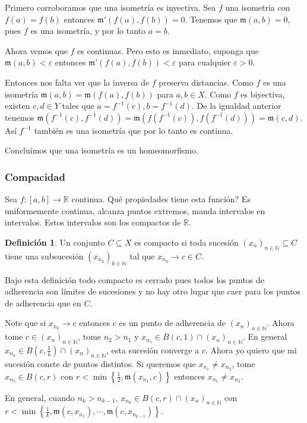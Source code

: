 \documentclass[12pt]{article}
\theoremstyle{plain}
\theoremstyle{definition}
\newtheorem{Def}[Th]{Definición}       %
\theoremstyle{remark}
\numberwithin{equation}{section}
\newcommand{\bN}{\mathbb{N}}        %
\newcommand{\bR}{\mathbb{R}}        %
\newcommand{\mm}{\mathfrak{m}}      %
\renewcommand{\:}{\colon}           %
\newcommand{\conj}[1]{\left\lbrace#1\right\rbrace}
\newcommand{\bonj}[1]{\left\lbrack#1\right\rbrack}
\begin{document}
\begin{multicols}{2}
\begin{ptcb}
Primero corroboramos que una isometría es inyectiva. Sea $f$ una isometría con $f(a)=f(b)$ entonces $\mm'(f(a),f(b))=0$. Tenemos que $\mm(a,b)=0$, pues $f$ es una isometría, y por lo tanto $a=b$.\par
Ahora vemos que $f$ es continuas. Pero esto es inmediato, suponga que $\mm(a,b)<\varepsilon$ entonces $\mm'(f(a),f(b))<\varepsilon$ para cualquier $\varepsilon>0$.\par
Entonces nos falta ver que la inversa de $f$ preserva distancias. Como $f$ es una isometría $\mm(a,b)=\mm(f(a),f(b))$ para $a,b\in X$. Como $f$ es biyectiva, existen $c,d\in Y$ tales que $a=f^{-1}(c), b=f^{-1}(d)$. De la igualdad anterior tenemos $\mm(f^{-1}(c),f^{-1}(d))=\mm(f(f^{-1}(c)),f(f^{-1}(d)))=\mm(c,d)$. Así $f^{-1}$ también es una isometría que por lo tanto es continua. \par
Concluímos que una isometría es un homeomorfismo.
\end{ptcb}

\subsubsection*{Compacidad}

Sea $f\colon\bonj{a,b}\to \bR$ continua. Qué propiedades tiene esta función? Es uniformemente continua, alcanza puntos extremos, manda intervalos en intervalos. Estos intervalos son los compactos de $\bR$.

\begin{Def}\label{def:compactoSuccs}
  Un conjunto $C\subseteq X$ es compacto si toda sucesión $(x_n)_{n\in\bN}\subseteq C$ tiene una subsucesión $(x_{n_k})_{k\in\bN}$ tal que $x_{n_k}\to c\in C$.
\end{Def}

Bajo esta definición todo compacto es cerrado pues todos los puntos de adherencia son límites de sucesiones y no hay otro lugar que caer para los puntos de adherencia que en $C$.

Note que si $x_{n_k}\to c$ entonces $c$ es un punto de adherencia de $(x_n)_{n\in\bN}$.
Ahora tome $c\in\overline{(x_n)_{n\in\bN}}$, tome $n_2> n_1$ y $x_{n_1}\in B(c,1)\cap(x_n)_{n\in\bN}$. En general $x_{n_k}\in B(c,\frac{1}{k})\cap(x_n)_{n\in\bN}$, esta sucesión converge a $c$. Ahora yo quiero que mi sucesión conste de puntos distintos. Si queremos que $x_{n_1}\neq x_{n_2}$, tome $x_{n_2}\in B(c,r)$ con $r<\min\conj{\frac{1}{2},\mm(x_{n_1},c)}$ entonces $x_{n_1}\neq x_{n_2}$.\par
En general, cuando $n_k>n_{k-1}$, $x_{n_k}\in B(c,r)\cap (x_n)_{n\in\bN}$ con $r <\min\conj{\frac{1}{k},\mm(c,x_{n_1}),\cdots,\mm(c,x_{n_{k-1}})}$.


\end{multicols}
\end{document}
